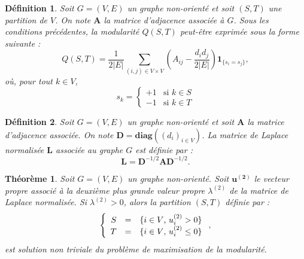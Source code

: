 \documentclass[c]{beamer}
\newtheorem*{deffr}{Définition}
\newtheorem*{theofr}{Théorème}
\begin{document}
\begin{frame}

    \begin{deffr}
        Soit $G = (V, E)$ un graphe non-orienté et soit $(S, T)$ une partition
        de $V$. On note $\mathbf{A}$ la matrice d'adjacence associée à $G$.
        Sous les conditions précédentes, la modularité $Q(S, T)$ peut-être
        exprimée sous la forme suivante :
        \[
            Q(S, T) = \frac{1}{2|E|} \sum_{(i, j) \in V \times V}
                \left( A_{ij} - \frac{d_i d_j}{2|E|} \right)
                \mathbf{1}_{\{s_i = s_j\}},
        \]
        où, pour tout $k \in V$,
        \[
            s_k = \left\{
                \begin{array}{ll}
                    +1 & \text{si $k \in S$} \\
                    -1 & \text{si $k \in T$}
                \end{array}
            \right.
        \]
    \end{deffr}

\end{frame}

\begin{frame}

    \begin{deffr}
        Soit $G = (V, E)$ un graphe non-orienté et soit $\mathbf{A}$ la matrice
        d'adjacence associée. On note $\mathbf{D} = \mathbf{diag}\left((d_i)_{i \in V}\right)$.
        La matrice de Laplace normalisée $\mathbf{L}$ associée au graphe $G$ est
        définie par :
        \[
            \mathbf{L} = \mathbf{D}^{-1/2} \mathbf{A} \mathbf{D}^{-1/2}.
        \]
    \end{deffr}

    \begin{theofr}
        Soit $G = (V, E)$ un graphe non-orienté. Soit $\mathbf{u^{(2)}}$ le vecteur
        propre associé à la deuxième plus grande valeur propre $\lambda^{(2)}$
        de la matrice de Laplace normalisée. Si $\lambda^{(2)} > 0$, alors la
        partition $(S, T)$ définie par :
        \[
            \left\{
                \begin{array}{r c l}
                    S & = & \{ i \in V \text{, } u^{(2)}_i > 0 \} \\
                    T & = & \{ i \in V \text{, } u^{(2)}_i \leq 0 \}
                \end{array}
            \right. ,
        \]
        est solution non triviale du problème de maximisation de la modularité.

    \end{theofr}

\end{frame}
\end{document}
